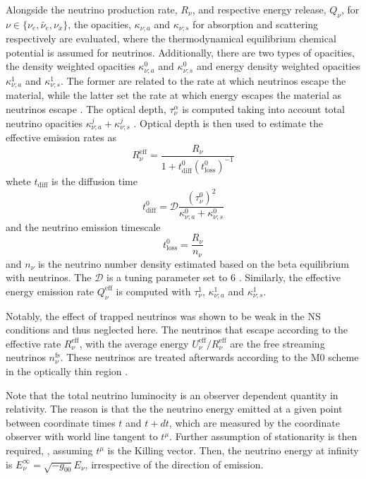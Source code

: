 Alongside the neutrino production rate, $R_{\nu}$, and respective energy release, $Q_{\nu}$, for 
$\nu\in\{\nu_e,\bar{\nu}_e,\nu_x\}$, the opacities, $\kappa_{\nu;a}$ and $\kappa_{\nu;s}$ 
for absorption and scattering respectively are evaluated, where the 
thermodynamical equilibrium chemical potential is assumed for neutrinos.
%
Additionally, there are two types of opacities, the density weighted opacities $\kappa_{\nu;a}^0$ and
$\kappa_{\nu;s}^0$ and energy density weighted opacities $\kappa_{\nu;a}^1$ and $\kappa_{\nu;s}^1$. 
The former are related to the rate at which neutrinos escape the material, 
while the latter set the rate at which energy escapes the material as neutrinos escape \citep{Ruffert:1995fs}.
%
The optical depth, $\tau_{\nu}^{\alpha}$ is computed taking into account 
total neutrino opacities $\kappa_{\nu;a}^j + \kappa_{\nu;s}^j$ \citep{Neilsen:2014hha}.
%
Optical depth is then used to estimate the effective emission rates \citep{Ruffert:1995fs} as 
%
\begin{equation}
R_{\nu}^{\text{eff}} = \frac{R_{\nu}}{1 + t_{\text{diff}}^0(t^0_{\text{loss}})^{-1}}
\label{eq:method:whisky:Rnueff}
\end{equation}
%
whete $t_{\text{diff}}$ is the diffusion time
%
\begin{equation}
t_{\text{diff}}^{0} = \mathcal{D}\frac{(\tau_{\nu}^0)^2}{\kappa_{\nu;a}^0 + \kappa_{\nu;s}^0}
\end{equation}
%
and the neutrino emission timescale 
%
\begin{equation}
t_{\text{loss}}^0 = \frac{R_{\nu}}{n_{\nu}}
\end{equation}
%
and $n_{\nu}$ is the neutrino number density estimated based on the 
beta equilibrium with  neutrinos. The $\mathcal{D}$ is a tuning parameter set to $6$
\citep{Radice:2018pdn}.
%
Similarly, the effective energy emission rate $Q_{\nu}^{\text{eff}}$ 
is computed with $\tau_{\nu}^1$, $\kappa_{\nu;a}^1$ and $\kappa_{\nu;s}^1$.

Notably, the effect of trapped neutrinos was shown to be weak in the \ac{NS} conditions 
\citep{Galeazzi:2013mia} and thus neglected here.
The neutrinos that escape according to the effective rate $R_{\nu}^{\text{eff}}$,
with the average energy $U_{\nu}^{\text{eff}}/R_{\nu}^{\text{eff}}$ 
are the free streaming neutrinos $n_{\nu}^{\text{fs}}$. 
%
These neutrinos are treated afterwards according to the 
M0 scheme in the optically thin region \citep{Radice:2016dwd}.


Note that the total neutrino luminocity is an observer dependent quantity in relativity. 
The reason is that the the neutrino energy emitted at a given point between coordinate times $t$ and $t+dt$, 
which are measured by the coordinate observer with world line tangent to $t^{\mu}$. 
Further assumption of stationarity is then required, \eg, assuming $t^{\mu}$ is the Killing vector. 
Then, the neutrino energy at infinity is $E_{\nu}^{\infty} = \sqrt{-g_{00}}E_{\nu}$, 
irrespective of the direction of emission.

